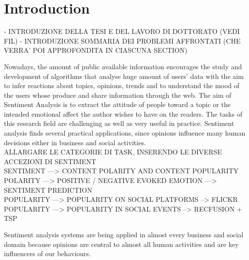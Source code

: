 \chapter{Introduction}
- INTRODUZIONE DELLA TESI E DEL LAVORO DI DOTTORATO (VEDI FIL)
- INTRODUZIONE SOMMARIA DEI PROBLEMI AFFRONTATI (CHE VERRA' POI APPROFONDITA IN CIASCUNA SECTION)

Nowadays, the amount of public available information encourages the study and development of algorithms that analyse huge amount of users' data with the aim to infer reactions about topics, opinions, trends and to understand the mood of the users whose produce and share information through the web. The aim of Sentiment Analysis is to extract the attitude of people toward a topic or the intended emotional affect the author wishes to have on the readers. The tasks of this research field are challenging as well as very useful in practice. Sentiment analysis finds several practical applications, since opinions influence many human decisions either in business and social activities.  
\\
ALLARGARE LE CATEGORIE DI TASK, INSERENDO LE DIVERSE ACCEZIONI DI SENTIMENT 
\\
SENTIMENT  ---> CONTENT POLARITY AND CONTENT POPULARITY
\\POLARITY   ---> POSITIVE / NEGATIVE EVOKED EMOTION ---> SENTIMENT PREDICTION
\\POPULARITY ---> POPULARITY ON SOCIAL PLATFORMS --> FLICKR
\\POPULARITY ---> POPULARITY IN SOCIAL EVENTS --> RECFUSION + TSP

Sentiment analysis systems are being applied in almost every business and social domain because opinions are central to almost all human activities and are key influencers of our behaviours. 

